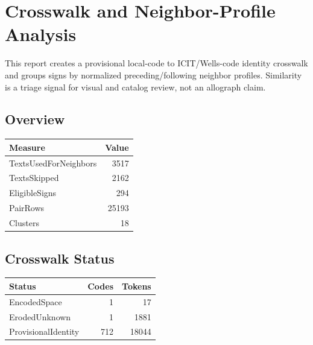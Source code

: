 ﻿\documentclass[11pt,a4paper]{article}
\begin{document}
\section*{Crosswalk and Neighbor-Profile Analysis}

This report creates a provisional local-code to ICIT/Wells-code identity crosswalk and groups signs by normalized preceding/following neighbor profiles. Similarity is a triage signal for visual and catalog review, not an allograph claim.

\subsection*{Overview}
\begin{center}
\begin{tabular}{lr}
\toprule
\textbf{Measure} & \textbf{Value} \\
\midrule
TextsUsedForNeighbors & 3517 \\
TextsSkipped & 2162 \\
EligibleSigns & 294 \\
PairRows & 25193 \\
Clusters & 18 \\
\bottomrule
\end{tabular}
\end{center}

\subsection*{Crosswalk Status}
\begin{center}
\begin{tabular}{lrr}
\toprule
\textbf{Status} & \textbf{Codes} & \textbf{Tokens} \\
\midrule
EncodedSpace & 1 & 17 \\
ErodedUnknown & 1 & 1881 \\
ProvisionalIdentity & 712 & 18044 \\
\bottomrule
\end{tabular}
\end{center}
\end{document}
